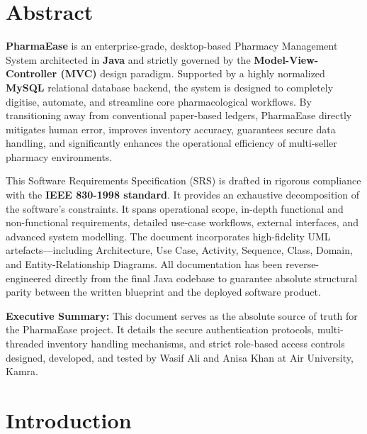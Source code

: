 \documentclass[12pt,a4paper]{report}
\begin{document}
\chapter*{Abstract}

\textbf{PharmaEase} is an enterprise-grade, desktop-based Pharmacy Management System architected in \textbf{Java} and strictly governed by the \textbf{Model-View-Controller (MVC)} design paradigm. Supported by a highly normalized \textbf{MySQL} relational database backend, the system is designed to completely digitise, automate, and streamline core pharmacological workflows. By transitioning away from conventional paper-based ledgers, PharmaEase directly mitigates human error, improves inventory accuracy, guarantees secure data handling, and significantly enhances the operational efficiency of multi-seller pharmacy environments.

This Software Requirements Specification (SRS) is drafted in rigorous compliance with the \textbf{IEEE 830-1998 standard}. It provides an exhaustive decomposition of the software's constraints. It spans operational scope, in-depth functional and non-functional requirements, detailed use-case workflows, external interfaces, and advanced system modelling. The document incorporates high-fidelity UML artefacts—including Architecture, Use Case, Activity, Sequence, Class, Domain, and Entity-Relationship Diagrams. All documentation has been reverse-engineered directly from the final Java codebase to guarantee absolute structural parity between the written blueprint and the deployed software product.

\vspace{1em}
\begin{infobox}
\textbf{Executive Summary:}
This document serves as the absolute source of truth for the PharmaEase project. It details the secure authentication protocols, multi-threaded inventory handling mechanisms, and strict role-based access controls designed, developed, and tested by Wasif Ali and Anisa Khan at Air University, Kamra.
\end{infobox}

\clearpage

\tableofcontents
\listoffigures
\clearpage

\chapter{Introduction}
\end{document}
